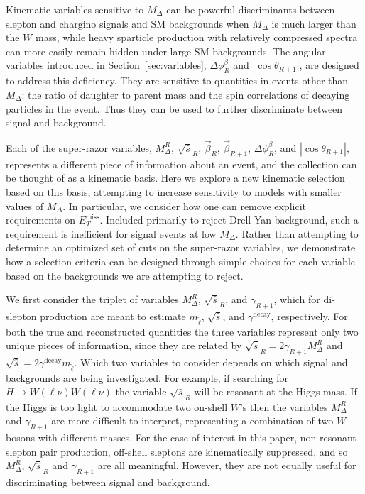 Kinematic variables sensitive to $M_{\Delta}$ can be powerful discriminants between slepton and chargino signals and SM backgrounds when $M_{\Delta}$ is much larger than the $W$ mass, while heavy sparticle production with relatively compressed spectra can more easily
remain hidden under large SM backgrounds. The angular variables introduced in Section~\ref{sec:variables}, $\Delta \phi_{R}^{\beta}$ and $|\cos\theta_{R+1}|$, are designed to address this deficiency. They are sensitive to quantities in events other than $M_{\Delta}$: the ratio of daughter to parent mass and the spin correlations of decaying particles in the event. Thus they can be used to further discriminate between signal and background. 

Each of the super-razor variables, $M_{\Delta}^{R}$, $\sqrt{\hat{s}}_{R}$, $\vec{\beta}_{R}$, $\vec{\beta}_{R+1}$, $\Delta \phi_{R}^{\beta}$, and $|\cos\theta_{R+1}|$, represents a different piece of information about an event, and the collection can be thought of as a kinematic basis. Here we explore a new kinematic selection based on this basis, attempting to increase sensitivity to models with smaller values of  $M_{\Delta}$. In particular, we consider how one can remove explicit requirements on $E_{T}^\text{miss}$. Included primarily to reject Drell-Yan background, such a requirement is inefficient for signal events at low $M_{\Delta}$. Rather than attempting to determine an optimized set of cuts on the super-razor variables, we demonstrate how a selection criteria can be designed through simple choices for each variable based on the backgrounds we are attempting to reject.

We first consider the triplet of variables $M_{\Delta}^{R}$, $\sqrt{\hat{s}}_{R}$, and $\gamma_{R+1}$, which for di-slepton production are meant to estimate $m_{\tilde{\ell}}$, $\sqrt{\hat{s}}$, and $\gamma^\text{decay}$, respectively. For both the true and reconstructed quantities the three variables represent only two unique pieces of information, since they are related by $\sqrt{\hat{s}}_{R} = 2 \gamma_{R+1}M_{\Delta}^{R}$ and $\sqrt{\hat{s}} = 2 \gamma^\text{decay}m_{\tilde{\ell}}$. Which two variables to consider depends on which signal and backgrounds are being investigated. For example, if searching for $H \to W(\ell\nu)W(\ell\nu)$ the variable $\sqrt{\hat{s}}_{R}$ will be resonant at the Higgs mass. If the Higgs is too light to accommodate two on-shell $W$'s then the variables  $M_{\Delta}^{R}$ and $\gamma_{R+1}$ are more difficult to interpret, representing a combination of two $W$ bosons with different masses. For the case of interest in this paper, non-resonant slepton pair production, off-shell sleptons are kinematically suppressed, and so  $M_{\Delta}^{R}$, $\sqrt{\hat{s}}_{R}$ and $\gamma_{R+1}$ are all meaningful. However, they are not equally useful for discriminating between signal and background.
 

